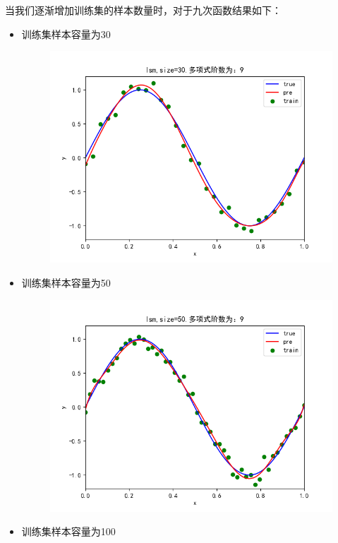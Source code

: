 \documentclass[lang=cn,a4paper,cite=authoryear]{elegantpaper}
\begin{document}
当我们逐渐增加训练集的样本数量时，对于九次函数结果如下：
\begin{itemize}
	\item 训练集样本容量为30
	\begin{figure}[H]
		\centering
		\includegraphics[scale=0.5]{30}
	\end{figure}
\item 训练集样本容量为50
\begin{figure}[H]
	\centering
	\includegraphics[scale=0.5]{50}
\end{figure}
\item 训练集样本容量为100
\begin{figure}[H]
	\centering

\end{figure}
\end{itemize}
\end{document}
